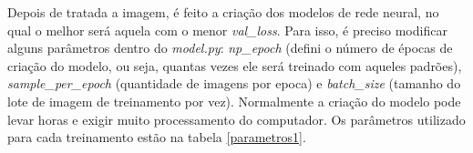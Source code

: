 	\begin{figure}[H]
		\centering
		\Caption{\label{combo}}
\end{figure}

Depois de tratada a imagem, é feito a criação dos modelos de rede neural, no qual o melhor será aquela com o menor \textit{val\_loss}. Para isso, é preciso modificar alguns parâmetros dentro do \textit{model.py}: \textit{np\_epoch} (defini o número de épocas de criação do modelo, ou seja, quantas vezes ele será treinado com aqueles padrões), \textit{sample\_per\_epoch} (quantidade de imagens por epoca) e \textit{batch\_size} (tamanho do lote de imagem de treinamento por vez). Normalmente a criação do modelo pode levar horas e exigir muito processamento do computador. Os parâmetros utilizado para cada treinamento estão na tabela \ref{parametros1}.

